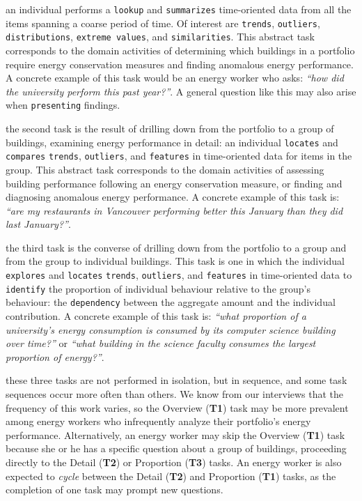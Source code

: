 \documentclass[journal]{vgtc}                %
\newcommand{\bstart}[1]{\vspace{1mm} \noindent{\textbf{#1:}}}
\begin{document}
\bstart{T1 / Overview} an individual performs a {\tt lookup} and {\tt summarizes} time-oriented data from all the items spanning a coarse period of time. 
Of interest are {\tt trends}, {\tt outliers}, {\tt distributions}, {\tt extreme values}, and {\tt similarities}. 
This abstract task corresponds to the domain activities of determining which buildings in a portfolio require energy conservation measures and finding anomalous energy performance. 
A concrete example of this task would be an energy worker who asks: {\it ``how did the university perform this past year?''}.
A general question like this may also arise when {\tt presenting} findings.

\bstart{T2 / Detail} the second task is the result of drilling down from the portfolio to a group of buildings, examining energy performance in detail: an individual {\tt locates} and {\tt compares} {\tt trends}, {\tt outliers}, and {\tt features} in time-oriented data for items in the group.
This abstract task corresponds to the domain activities of assessing building performance following an energy conservation measure, or finding and diagnosing anomalous energy performance. 
A concrete example of this task is: {\it ``are my restaurants in Vancouver performing better this January than they did last January?''}.

\bstart{T3 / Proportion} the third task is the converse of drilling down from the portfolio to a group and from the group to individual buildings.
This task is one in which the individual {\tt explores} and {\tt locates} {\tt trends}, {\tt outliers}, and {\tt features} in time-oriented data to {\tt identify} the proportion of individual behaviour relative to the group's behaviour: the {\tt dependency} between the aggregate amount and the individual contribution.
A concrete example of this task is: {\it ``what proportion of a university's energy consumption is consumed by its computer science building over time?''} or {\it ``what building in the science faculty consumes the largest proportion of energy?''}.

\bstart{Task sequences} these three tasks are not performed in isolation, but in sequence, and some task sequences occur more often than others. 
We know from our interviews that the frequency of this work varies, so the Overview ({\bf T1}) task may be more prevalent among energy workers who infrequently analyze their portfolio's energy performance.
Alternatively, an energy worker may skip the Overview ({\bf T1}) task because she or he has a specific question about a group of buildings, proceeding directly to the Detail ({\bf T2}) or Proportion ({\bf T3}) tasks. 
An energy worker is also expected to {\it cycle} between the Detail ({\bf T2}) and Proportion ({\bf T1}) tasks, as the completion of one task may prompt new questions.
\end{document}
